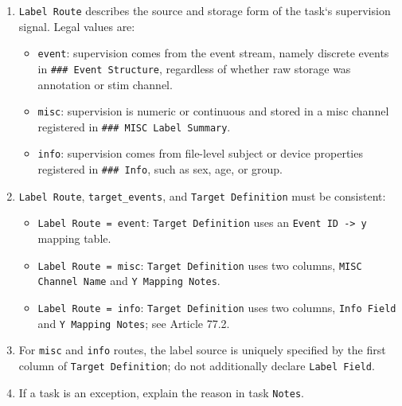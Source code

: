 \begin{tcolorbox}
\smallskip{}\par\smallskip

\begin{enumerate}[leftmargin=1.5em,noitemsep,topsep=2pt]
\item \texttt{Label Route} describes the source and storage form of the task`s supervision signal. Legal values are:
\begin{itemize}[leftmargin=1.2em,noitemsep,topsep=1pt]
\item \texttt{event}: supervision comes from the event stream, namely discrete events in \texttt{\#\#\# Event Structure}, regardless of whether raw storage was annotation or stim channel.
\item \texttt{misc}: supervision is numeric or continuous and stored in a misc channel registered in \texttt{\#\#\# MISC Label Summary}.
\item \texttt{info}: supervision comes from file-level subject or device properties registered in \texttt{\#\#\# Info}, such as sex, age, or group.
\end{itemize}
\item \texttt{Label Route}, \texttt{target\_events}, and \texttt{Target Definition} must be consistent:
\begin{itemize}[leftmargin=1.2em,noitemsep,topsep=1pt]
\item \texttt{Label Route = event}: \texttt{Target Definition} uses an \texttt{Event ID -> y} mapping table.
\item \texttt{Label Route = misc}: \texttt{Target Definition} uses two columns, \texttt{MISC Channel Name} and \texttt{Y Mapping Notes}.
\item \texttt{Label Route = info}: \texttt{Target Definition} uses two columns, \texttt{Info Field} and \texttt{Y Mapping Notes}; see Article 77.2.
\end{itemize}
\item For \texttt{misc} and \texttt{info} routes, the label source is uniquely specified by the first column of \texttt{Target Definition}; do not additionally declare \texttt{Label Field}.
\item If a task is an exception, explain the reason in task \texttt{Notes}.
\end{enumerate}

\smallskip{}\par\smallskip


\end{tcolorbox}
